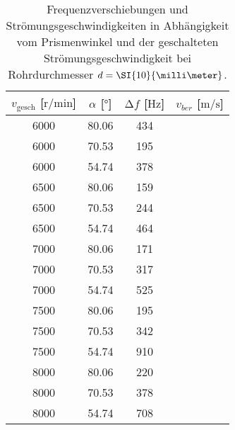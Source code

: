 \begin{table}
    \centering
    \caption{Frequenzverschiebungen und Strömungsgeschwindigkeiten in Abhängigkeit vom Prismenwinkel und der geschalteten Strömungsgeschwindigkeit bei Rohrdurchmesser $\protect d = \SI{10}{\milli\meter}$.}
    \label{tab:5}
    \begin{tabular}{c c c c}
        \toprule
        $v_{\text{gesch}}$ [$\si{{\text{r}}\per\minute}$]  & $\alpha$ [$\si{\degree}$]  & $\increment f$ [$\si{\hertz}$] &  $v_{ber}$ [$\si{\meter\per\second}$]\\
        \midrule
        6000    &   80.06    & 434   & ~ \\ 
        6000    &   70.53    & 195   & ~ \\ 
        6000    &   54.74    & 378   & ~ \\ 
        \midrule
        6500    &   80.06   & 159    & ~ \\ 
        6500    &   70.53   & 244    & ~ \\ 
        6500    &   54.74   & 464    & ~ \\ 
        \midrule
        7000    &   80.06   & 171    & ~ \\ 
        7000    &   70.53   & 317    & ~ \\ 
        7000    &   54.74   & 525    & ~ \\ 
        \midrule
        7500    &   80.06   & 195    & ~ \\ 
        7500    &   70.53   & 342    & ~ \\ 
        7500    &   54.74   & 910   & ~ \\ 
        \midrule
        8000    &   80.06   & 220    & ~ \\ 
        8000    &   70.53   & 378    & ~ \\ 
        8000    &   54.74   & 708   & ~ \\ 
        \bottomrule
    \end{tabular}
\end{table}


